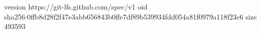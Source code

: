 version https://git-lfs.github.com/spec/v1
oid sha256:0ffb8d28f2f47e3abb656843b0ffe7df89b539934fdd054a81f0979a118f23c6
size 493593
